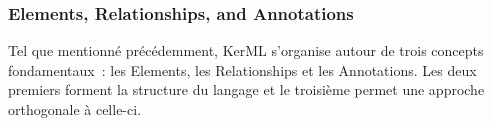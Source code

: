 


\subsubsection{Elements, Relationships, and Annotations}
Tel que mentionné précédemment, KerML s'organise autour de trois concepts fondamentaux~: les Elements, les Relationships et les Annotations. Les deux premiers forment la structure du langage et le troisième permet une approche orthogonale à celle-ci. 

